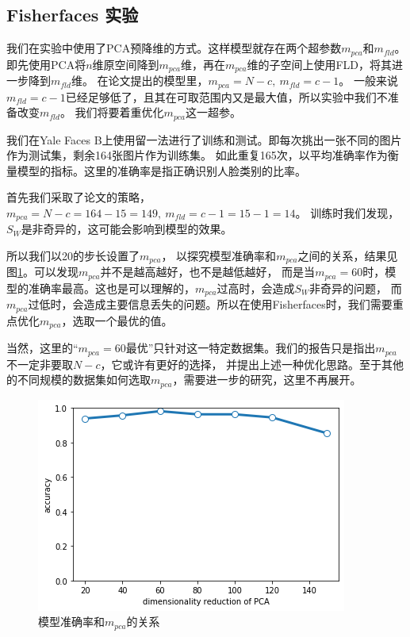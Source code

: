 \documentclass{ctexart}
\begin{document}
\subsection{Fisherfaces 实验}\label{Fisherfaces exp}
我们在实验中使用了PCA预降维的方式。这样模型就存在两个超参数$m_{pca}$和$m_{fld}$。
即先使用PCA将$n$维原空间降到$m_{pca}$维，再在$m_{pca}$维的子空间上使用FLD，将其进一步降到$m_{fld}$维。
在论文\cite{Belhumeur1997Eigenfaces}提出的模型里，$m_{pca}=N-c,\ m_{fld}=c-1$。
一般来说$m_{fld}=c-1$已经足够低了，且其在可取范围内又是最大值，所以实验中我们不准备改变$m_{fld}$。
我们将要着重优化$m_{pca}$这一超参。

我们在Yale Faces B上使用留一法进行了训练和测试。即每次挑出一张不同的图片作为测试集，剩余164张图片作为训练集。
如此重复165次，以平均准确率作为衡量模型的指标。这里的准确率是指正确识别人脸类别的比率。

首先我们采取了论文\cite{Belhumeur1997Eigenfaces}的策略，$m_{pca}=N-c=164-15=149,\ m_{fld}=c-1=15-1=14$。
训练时我们发现，$S_W$是非奇异的，这可能会影响到模型的效果。

所以我们以20的步长设置了$m_{pca}$，
以探究模型准确率和$m_{pca}$之间的关系，结果见图\ref{m_pca}。可以发现$m_{pca}$并不是越高越好，也不是越低越好，
而是当$m_{pca}=60$时，模型的准确率最高。这也是可以理解的，$m_{pca}$过高时，会造成$S_W$非奇异的问题，
而$m_{pca}$过低时，会造成主要信息丢失的问题。所以在使用Fisherfaces时，我们需要重点优化$m_{pca}$，选取一个最优的值。

当然，这里的“$m_{pca}=60$最优”只针对这一特定数据集。我们的报告只是指出$m_{pca}$不一定非要取$N-c$，它或许有更好的选择，
并提出上述一种优化思路。至于其他的不同规模的数据集如何选取$m_{pca}$，需要进一步的研究，这里不再展开。

\begin{figure}[htbp]
    \centering
    \includegraphics[scale=0.45]{imgs/pca_fld_accuracy.png}
    \caption{模型准确率和$m_{pca}$的关系}
    \label{m_pca}
\end{figure}
\end{document}
